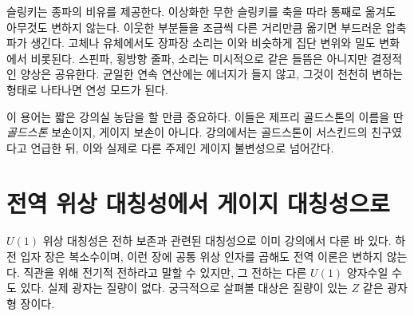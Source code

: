 \begin{classroomqa}
\end{classroomqa}

슬링키는 종파의 비유를 제공한다. 이상화한 무한 슬링키를 축을 따라 통째로 옮겨도 아무것도 변하지 않는다. 이웃한 부분들을 조금씩 다른 거리만큼 옮기면 부드러운 압축파가 생긴다. 고체나 유체에서도 장파장 소리는 이와 비슷하게 집단 변위와 밀도 변화에서 비롯된다. 스핀파, 횡방향 줄파, 소리는 미시적으로 같은 들뜸은 아니지만 결정적인 양상은 공유한다. 균일한 연속 연산에는 에너지가 들지 않고, 그것이 천천히 변하는 형태로 나타나면 연성 모드가 된다.

이 용어는 짧은 강의실 농담을 할 만큼 중요하다. 이들은 제프리 골드스톤의 이름을 딴 \emph{골드스톤} 보손이지, 게이지 보손이 아니다. 강의에서는 골드스톤이 서스킨드의 친구였다고 언급한 뒤, 이와 실제로 다른 주제인 게이지 불변성으로 넘어간다.

\section{전역 위상 대칭성에서 게이지 대칭성으로}

\(U(1)\) 위상 대칭성은 전하 보존과 관련된 대칭성으로 이미 강의에서 다룬 바 있다. 하전 입자 장은 복소수이며, 이런 장에 공통 위상 인자를 곱해도 전역 이론은 변하지 않는다. 직관을 위해 전기적 전하라고 말할 수 있지만, 그 전하는 다른 \(U(1)\) 양자수일 수도 있다. 실제 광자는 질량이 없다. 궁극적으로 살펴볼 대상은 질량이 있는 \(Z\) 같은 광자형 장이다.

